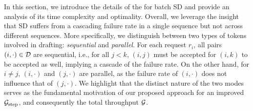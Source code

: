 

In this section, we introduce the details of the \alg{} for batch SD and provide an analysis of its time complexity and optimality.
Overall, we leverage the insight that SD suffers from a cascading failure rate in a single sequence but not across different sequences.
More specifically, we distinguish between two types of tokens involved in drafting: \textit{sequential} and \textit{parallel}. 
For each request $r_i$, all pairs $(i, \cdot) \in {\mathcal{D}}$ are sequential, i.e., for all $j < k$, $(i,j)$ must be accepted for $(i, k)$ to be accepted as well, implying a cascade of the failure rate. 
On the other hand, for $i \neq j$, $(i, \cdot)$ and $(j, \cdot)$ are parallel, as the failure rate of $(i, \cdot)$ does not influence that of $(j, \cdot)$. 
We highlight that the distinct nature of the two modes serves as the fundamental motivation of our proposed approach for an improved ${\mathcal{G}}_{\text{step}}$, and consequently the total throughput ${\mathcal{G}}$.